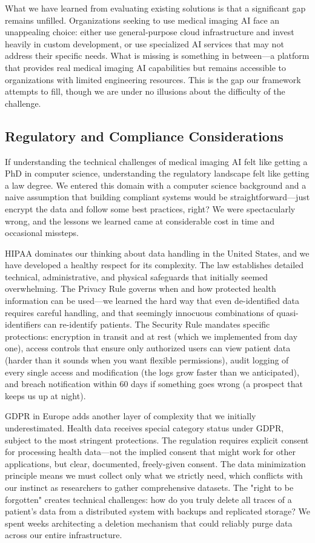 \documentclass[12pt,a4paper]{article}
\begin{document}
What we have learned from evaluating existing solutions is that a significant gap remains unfilled. Organizations seeking to use medical imaging AI face an unappealing choice: either use general-purpose cloud infrastructure and invest heavily in custom development, or use specialized AI services that may not address their specific needs. What is missing is something in between—a platform that provides real medical imaging AI capabilities but remains accessible to organizations with limited engineering resources. This is the gap our framework attempts to fill, though we are under no illusions about the difficulty of the challenge.

\subsection{Regulatory and Compliance Considerations}

If understanding the technical challenges of medical imaging AI felt like getting a PhD in computer science, understanding the regulatory landscape felt like getting a law degree. We entered this domain with a computer science background and a naive assumption that building compliant systems would be straightforward—just encrypt the data and follow some best practices, right? We were spectacularly wrong, and the lessons we learned came at considerable cost in time and occasional missteps.

HIPAA dominates our thinking about data handling in the United States, and we have developed a healthy respect for its complexity. The law establishes detailed technical, administrative, and physical safeguards that initially seemed overwhelming. The Privacy Rule governs when and how protected health information can be used—we learned the hard way that even de-identified data requires careful handling, and that seemingly innocuous combinations of quasi-identifiers can re-identify patients. The Security Rule mandates specific protections: encryption in transit and at rest (which we implemented from day one), access controls that ensure only authorized users can view patient data (harder than it sounds when you want flexible permissions), audit logging of every single access and modification (the logs grow faster than we anticipated), and breach notification within 60 days if something goes wrong (a prospect that keeps us up at night).

GDPR in Europe adds another layer of complexity that we initially underestimated. Health data receives special category status under GDPR, subject to the most stringent protections. The regulation requires explicit consent for processing health data—not the implied consent that might work for other applications, but clear, documented, freely-given consent. The data minimization principle means we must collect only what we strictly need, which conflicts with our instinct as researchers to gather comprehensive datasets. The "right to be forgotten" creates technical challenges: how do you truly delete all traces of a patient's data from a distributed system with backups and replicated storage? We spent weeks architecting a deletion mechanism that could reliably purge data across our entire infrastructure.
\end{document}
